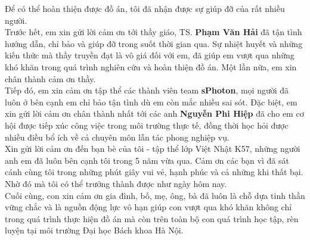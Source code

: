  
 
\begin{acknowledgements}      

Để có thể hoàn thiện được đồ án, tôi đã nhận được sự giúp đỡ của rất nhiều người.\\[0.2cm]

Trước hết, em xin gửi lời cảm ơn tới thầy giáo, TS. \textbf{Phạm Văn Hải} đã tận tình hướng dẫn, chỉ bảo và giúp đỡ trong suốt thời gian qua. Sự nhiệt huyết và những kiến thức mà thầy truyền đạt là vô giá đối với em, đã giúp em vượt qua những khó khăn trong quá trình nghiên cứu và hoàn thiện đồ án. Một lần nữa, em xin chân thành cảm ơn thầy.\\[0.2cm]

Tiếp đó, em xin cảm ơn tập thể các thành viên team \textbf{sPhoton}, mọi người đã luôn ở bên cạnh em chỉ bảo tận tình dù em còn mắc nhiều sai sót. Đặc biệt, em xin gửi lời cảm ơn chân thành nhất tới các anh \textbf{Nguyễn Phi Hiệp} đã cho em cơ hội được tiếp xúc công việc trong môi trường thực tế, đồng thời học hỏi được nhiều điều bổ ích về cả chuyên môn lẫn tác phong nghiệp vụ. \\[0.2cm]

Xin gửi lời cảm ơn đến bạn bè của tôi - tập thể lớp Việt Nhật K57, những người anh em đã luôn bên cạnh  tôi trong 5 năm vừa qua. Cảm ơn các bạn vì đã sát cánh cùng tôi trong những phút giây vui vẻ, hạnh phúc và cả những khi thất bại. Nhờ đó mà tôi có thể trưởng thành được như ngày hôm nay.  	\\[0.2cm]
 
Cuối cùng, con xin cảm ơn gia đình, bố, mẹ, ông, bà đã luôn là chỗ dựa tinh thần vững chắc và là nguồn động lực vô hạn giúp con vượt qua khó khăn không chỉ trong quá trình thực hiện đồ án mà còn trên toàn bộ con quá trình học tập, rèn luyện tại môi trường Đại học Bách khoa Hà Nội.

\end{acknowledgements}
  